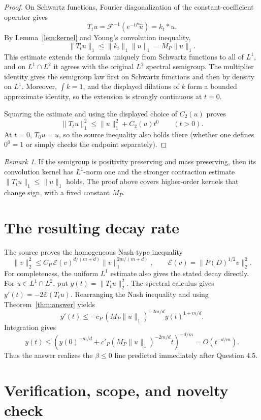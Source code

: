 \documentclass[11pt]{article}
\theoremstyle{remark}
\newtheorem{remark}[theorem]{Remark}
\newcommand{\F}{\mathcal F}
\newcommand{\cE}{\mathcal E}
\begin{document}
\begin{proof}
On Schwartz functions, Fourier diagonalization of the constant-coefficient
operator gives
\[
 T_tu=\F^{-1}(e^{-tP}\widehat u)=k_t*u.
\]
By Lemma~\ref{lem:kernel} and Young's convolution inequality,
\[
 \|T_tu\|_1\le\|k_t\|_1\|u\|_1=M_P\|u\|_1.
\]
This estimate extends the formula uniquely from Schwartz functions to all of
\(L^1\), and on \(L^1\cap L^2\) it agrees with the original \(L^2\)
spectral semigroup.  The multiplier identity gives the semigroup law first on
Schwartz functions and then by density on \(L^1\).  Moreover,
\(\int k=1\), and the displayed dilations of \(k\) form a bounded approximate
identity, so the extension is strongly continuous at \(t=0\).

Squaring the estimate and using the displayed choice of \(C_2(u)\) proves
\[
 \|T_tu\|_1^2\le \|u\|_1^2+C_2(u)t^0\qquad(t>0).
\]
At \(t=0\), \(T_0u=u\), so the source inequality also holds there (whether
one defines \(0^0=1\) or simply checks the endpoint separately).
\end{proof}

\begin{remark}
If the semigroup is positivity preserving and mass preserving, then its
convolution kernel has \(L^1\)-norm one and the stronger contraction estimate
\(\|T_tu\|_1\le\|u\|_1\) holds.  The proof above covers higher-order kernels
that change sign, with a fixed constant \(M_P\).
\end{remark}

\section{The resulting decay rate}

The source proves the homogeneous Nash-type inequality
\[
 \|v\|_2^2
 \le C_P\,\cE(v)^{d/(m+d)}\|v\|_1^{2m/(m+d)},
 \qquad
 \cE(v)=\|P(D)^{1/2}v\|_2^2.
\]
For completeness, the uniform \(L^1\) estimate also gives the stated decay
directly.  For \(u\in L^1\cap L^2\), put \(y(t)=\|T_tu\|_2^2\).  The spectral
calculus gives \(y'(t)=-2\cE(T_tu)\).  Rearranging the Nash inequality and
using Theorem~\ref{thm:answer} yields
\[
 y'(t)
 \le -c_P\,(M_P\|u\|_1)^{-2m/d}y(t)^{1+m/d}.
\]
Integration gives
\[
 y(t)\le
 \left(y(0)^{-m/d}
 +c'_P(M_P\|u\|_1)^{-2m/d}t\right)^{-d/m}
 =O(t^{-d/m}).
\]
Thus the answer realizes the \(\beta\le0\) line predicted immediately after
Question 4.5.

\section{Verification, scope, and novelty check}
\end{document}

